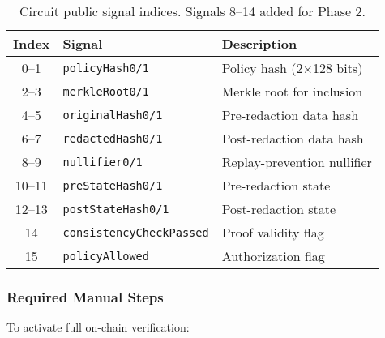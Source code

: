 \begin{table}[h]
\centering
\small
\begin{tabular}{clp{5.5cm}}
\toprule
\textbf{Index} & \textbf{Signal} & \textbf{Description} \\
\midrule
0--1 & \texttt{policyHash0/1} & Policy hash (2$\times$128 bits) \\
2--3 & \texttt{merkleRoot0/1} & Merkle root for inclusion \\
4--5 & \texttt{originalHash0/1} & Pre-redaction data hash \\
6--7 & \texttt{redactedHash0/1} & Post-redaction data hash \\
8--9 & \texttt{nullifier0/1} & Replay-prevention nullifier \\
10--11 & \texttt{preStateHash0/1} & Pre-redaction state \\
12--13 & \texttt{postStateHash0/1} & Post-redaction state \\
14 & \texttt{consistencyCheckPassed} & Proof validity flag \\
15 & \texttt{policyAllowed} & Authorization flag \\
\bottomrule
\end{tabular}
\caption{Circuit public signal indices. Signals 8--14 added for Phase 2.}
\label{tab:public_signals}
\end{table}

\subsubsection{Required Manual Steps}

To activate full on-chain verification:

